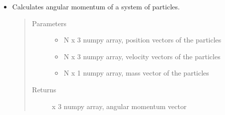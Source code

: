 \documentclass[letterpaper,10pt,english]{sphinxmanual}
\begin{document}
\begin{DUlineblock}{0em}
\item[] 
\end{DUlineblock}
\begin{itemize}
\item {} 

\begin{fulllineitems}
\label{\detokenize{physics:nbody.lib.physics.calc_ang_mom}}
\sphinxAtStartPar
Calculates angular momentum of a system of particles.
\begin{quote}\begin{description}
\item[{Parameters}] \leavevmode\begin{itemize}
\item {} 
\sphinxAtStartPar
{} \textendash{} N x 3 numpy array, position vectors of the particles

\item {} 
\sphinxAtStartPar
{} \textendash{} N x 3 numpy array, velocity vectors of the particles

\item {} 
\sphinxAtStartPar
{} \textendash{} N x 1 numpy array, mass vector of the particles

\end{itemize}

\item[{Returns}] \leavevmode
{} x 3 numpy array, angular momentum vector

\end{description}\end{quote}

\end{fulllineitems}


\end{itemize}
\end{document}
